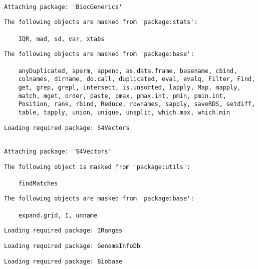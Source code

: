 \documentclass[
  letterpaper,
  DIV=11,
  numbers=noendperiod]{scrreprt}
\begin{document}
\begin{verbatim}

Attaching package: 'BiocGenerics'
\end{verbatim}

\begin{verbatim}
The following objects are masked from 'package:stats':

    IQR, mad, sd, var, xtabs
\end{verbatim}

\begin{verbatim}
The following objects are masked from 'package:base':

    anyDuplicated, aperm, append, as.data.frame, basename, cbind,
    colnames, dirname, do.call, duplicated, eval, evalq, Filter, Find,
    get, grep, grepl, intersect, is.unsorted, lapply, Map, mapply,
    match, mget, order, paste, pmax, pmax.int, pmin, pmin.int,
    Position, rank, rbind, Reduce, rownames, sapply, saveRDS, setdiff,
    table, tapply, union, unique, unsplit, which.max, which.min
\end{verbatim}

\begin{verbatim}
Loading required package: S4Vectors
\end{verbatim}

\begin{verbatim}

Attaching package: 'S4Vectors'
\end{verbatim}

\begin{verbatim}
The following object is masked from 'package:utils':

    findMatches
\end{verbatim}

\begin{verbatim}
The following objects are masked from 'package:base':

    expand.grid, I, unname
\end{verbatim}

\begin{verbatim}
Loading required package: IRanges
\end{verbatim}

\begin{verbatim}
Loading required package: GenomeInfoDb
\end{verbatim}

\begin{verbatim}
Loading required package: Biobase
\end{verbatim}
\end{document}

